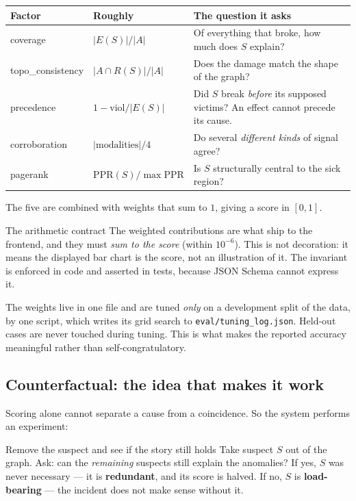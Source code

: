 \documentclass[11pt,a4paper]{article}
\newcommand{\code}[1]{\texttt{\small #1}}
\begin{document}
\begin{center}
\footnotesize
\begin{tabular}{@{}l l p{6.9cm}@{}}
\toprule
\textbf{Factor} & \textbf{Roughly} & \textbf{The question it asks} \\
\midrule
coverage       & $|E(S)| / |A|$ & Of everything that broke, how much does $S$ explain? \\
topo\_consistency & $|A \cap R(S)|/|A|$ & Does the damage match the shape of the graph? \\
precedence     & $1 - \text{viol}/|E(S)|$ & Did $S$ break \emph{before} its supposed victims? An effect cannot precede its cause. \\
corroboration  & $|\text{modalities}|/4$ & Do several \emph{different kinds} of signal agree? \\
pagerank       & $\mathrm{PPR}(S)/\max \mathrm{PPR}$ & Is $S$ structurally central to the sick region? \\
\bottomrule
\end{tabular}
\end{center}

The five are combined with weights that sum to $1$, giving a score in $[0,1]$.

\begin{keybox}{The arithmetic contract}
The weighted contributions are what ship to the frontend, and they must
\emph{sum to the score} (within $10^{-6}$). This is not decoration: it means the
displayed bar chart is the score, not an illustration of it. The invariant is
enforced in code and asserted in tests, because JSON Schema cannot express it.
\end{keybox}

The weights live in one file and are tuned \emph{only} on a development split of
the data, by one script, which writes its grid search to
\code{eval/tuning\_log.json}. Held-out cases are never touched during tuning.
This is what makes the reported accuracy meaningful rather than self-congratulatory.

\subsection{Counterfactual: the idea that makes it work}

Scoring alone cannot separate a cause from a coincidence. So the system performs
an experiment:

\begin{keybox}{Remove the suspect and see if the story still holds}
Take suspect $S$ out of the graph. Ask: can the \emph{remaining} suspects still
explain the anomalies? If yes, $S$ was never necessary --- it is
\textbf{redundant}, and its score is halved. If no, $S$ is \textbf{load-bearing}
--- the incident does not make sense without it.
\end{keybox}
\end{document}
